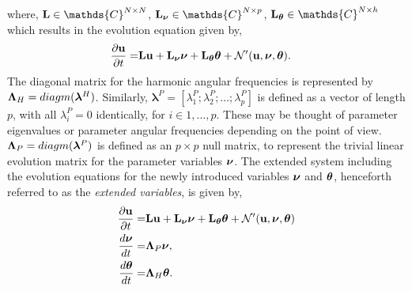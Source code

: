 where, $\Lu\in\mathds{C}^{N\times N}$, $\Lnu\in\mathds{C}^{N\times p}$, $\Ltheta\in\mathds{C}^{N\times h}$ which results in the evolution equation given by,  
\begin{align}
	\frac{\partial \mathbf{u}}{\partial t} =&  \mathbf{L}\mathbf{u} + \mathbf{L}_{\boldsymbol{\nu}}\boldsymbol{\nu} + \mathbf{L}_{\boldsymbol{\theta}}\boldsymbol{\theta} + \mathcal{N}'(\mathbf{u},\boldsymbol{\nu},\boldsymbol{\theta})  \nonumber.
\end{align}
The diagonal matrix for the harmonic angular frequencies is represented by $\mathbf{\Lambda}_{H} = diagm(\boldsymbol{\lambda}^{H})$. Similarly, $\boldsymbol{\lambda}^{P} = [\lambda^{P}_{1};\lambda^{P}_{2};\ldots;\lambda^{P}_{p}]$ is defined as a vector of length $p$, with all $\lambda^{P}_{i} = 0$ identically, for $i\in 1,\ldots, p$. These may be thought of parameter eigenvalues or parameter angular frequencies depending on the point of view. $\mathbf{\Lambda}_{P} = diagm(\boldsymbol{\lambda}^{P})$ is defined as an $p\times p$ null matrix, to represent the trivial linear evolution matrix for the parameter variables $\boldsymbol{\nu}$. The extended system including the evolution equations for the newly introduced variables $\boldsymbol{\nu}$ and $\boldsymbol{\theta}$, henceforth referred to as the \emph{extended variables}, is given by,
\begin{subequations}
	\begin{align}
			\label{eqn:evolution_extended1}
			\frac{\partial \mathbf{u}}{\partial t} =& \mathbf{L}\mathbf{u} + \mathbf{L}_{\boldsymbol{\nu}}\boldsymbol{\nu} +\mathbf{L}_{\boldsymbol{\theta}}\boldsymbol{\theta} + \mathcal{N}'(\mathbf{u},\boldsymbol{\nu},\boldsymbol{\theta}) \\
			\label{eqn:evolution_extended2}
			\frac{d \boldsymbol{\nu}}{d t} = & \mathbf{\Lambda}_{P}\boldsymbol{\nu}, \\
			\label{eqn:evolution_extended3}
			\frac{d \boldsymbol{\theta}}{d t} = &  \mathbf{\Lambda}_{H}\boldsymbol{\theta}. 
	\end{align}
	\label{eqn:evolution_extended}
\end{subequations}

